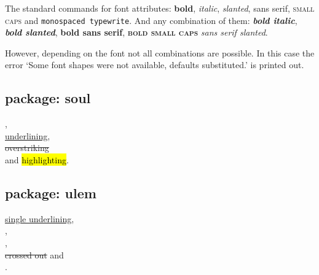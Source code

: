\begin{filecontents*}{\democodefile}
The standard commands for font attributes:  
\textbf{bold}, \textit{italic}, \textsl{slanted},
\textsf{sans serif}, \textsc{small caps} and
\texttt{monospaced typewrite}.
And any combination of them:
\textit{\textbf{bold italic}},
\textsl{\textbf{bold slanted}},
\textsf{\textbf{bold sans serif}},
\textsc{\textbf{bold small caps}}
\textsl{\textsf{sans serif slanted}}. 
\end{filecontents*}

%
%
However, depending on the font not all combinations are possible.
In this case the error `Some font shapes were not available, 
defaults substituted.' is printed out.

\subsection{package: soul}

\begin{filecontents*}{\democodefile}
, \\
\ul{underlining},   \\
\st{overstriking}   \\
and \hl{highlighting}. 
\end{filecontents*}

%

\subsection{package: ulem}

\begin{filecontents*}{\democodefile}
\uline{single underlining}, \\
, \\
, \\
\sout{crossed out} and \\
.
\end{filecontents*}

%

